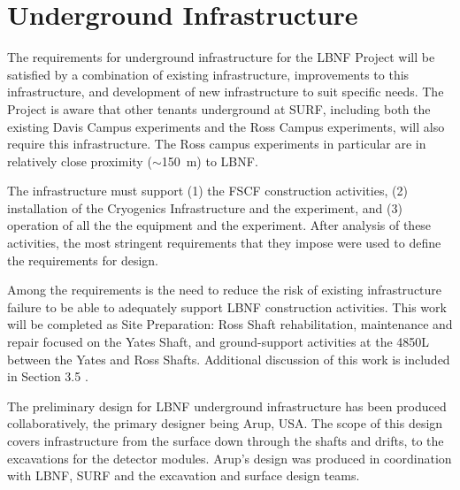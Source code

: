 \chapter{Underground Infrastructure}
\label{ch:fscf-und-infra}

The requirements for underground infrastructure for the LBNF Project will be satisfied by a combination of existing infrastructure, improvements to this infrastructure, and development of new infrastructure to suit specific needs. The Project is aware that %
other tenants underground at SURF, %
including both the existing Davis Campus experiments and the Ross Campus experiments, 
will also require this infrastructure. %
The Ross campus experiments in particular are in relatively close proximity ($\sim$150~m) to LBNF.

The infrastructure must support (1) the FSCF %
construction activities, (2) installation of the Cryogenics Infrastructure and the experiment, and (3) operation of all the %
the equipment and the experiment. 
After analysis of these activities, the most stringent requirements that they impose 
were used to define the requirements for design.

Among the requirements is the need to reduce the risk of existing infrastructure failure to be able to adequately support LBNF construction
 activities. This work will be completed as Site Preparation: Ross Shaft rehabilitation,  maintenance and repair focused on the Yates Shaft, and ground-support activities at the 4850L between the Yates and Ross Shafts. Additional discussion of this work is included in Section 3.5 .


The preliminary design for LBNF underground infrastructure has been produced collaboratively, %
the primary designer  %
being Arup, USA. %
The scope of this design %
covers infrastructure from the surface down through the shafts and drifts, to the excavations for the detector modules. Arup's design %
was produced in coordination with LBNF, SURF and the excavation and surface design teams. 

